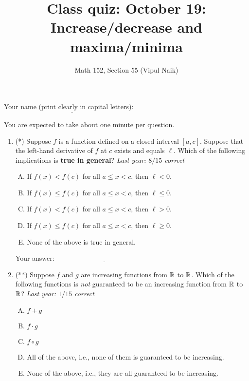 \documentclass[10pt]{amsart}
\title{Class quiz: October 19: Increase/decrease and maxima/minima}
\author{Math 152, Section 55 (Vipul Naik)}
\begin{document}
\maketitle

Your name (print clearly in capital letters): $\underline{\qquad\qquad\qquad\qquad\qquad\qquad\qquad\qquad\qquad\qquad}$

You are expected to take about one minute per question.

\begin{enumerate}

\item (*) Suppose $f$ is a function defined on a closed interval
  $[a,c]$. Suppose that the left-hand derivative of $f$ at $c$ exists
  and equals $\ell$. Which of the following implications is {\bf true
  in general}? {\em Last year: $8/15$ correct}

  \begin{enumerate}[(A)]
  \item If $f(x) < f(c)$ for all $a \le x < c$, then $\ell < 0$.
  \item If $f(x) \le f(c)$ for all $a \le x < c$, then $\ell \le 0$.
  \item If $f(x) < f(c)$ for all $a \le x < c$, then $\ell > 0$.
  \item If $f(x) \le f(c)$ for all $a \le x < c$, then $\ell \ge 0$.
  \item None of the above is true in general.
  \end{enumerate}

  \vspace{0.1in}
  Your answer: $\underline{\qquad\qquad\qquad\qquad\qquad\qquad\qquad}$
  \vspace{1.5in}

\item (**) Suppose $f$ and $g$ are increasing functions from $\mathbb{R}$ to
  $\mathbb{R}$. Which of the following functions is {\em not} guaranteed to be
  an increasing function from $\mathbb{R}$ to $\mathbb{R}$? {\em Last year: $1/15$
  correct}

  \begin{enumerate}[(A)]

  \item $f + g$
  \item $f \cdot g$
  \item $f \circ g$
  \item All of the above, i.e., none of them is guaranteed to be increasing.
  \item None of the above, i.e., they are all guaranteed to be increasing.
  \end{enumerate}


\end{enumerate}
\end{document}
